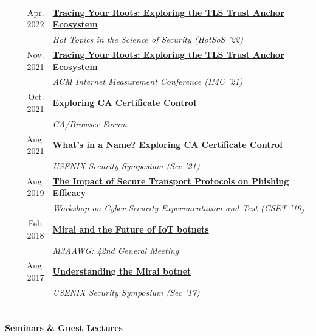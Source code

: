 \documentclass[10pt,singlecolumn]{article} %
\begin{document}
\begin{tabular}{rl}
Apr. 2022 & \textbf{\href{https://cps-vo.org/node/82522}{Tracing Your Roots: Exploring the TLS Trust Anchor Ecosystem}}\\
& \emph{Hot Topics in the Science of Security (HotSoS '22)}\\
Nov. 2021 & \textbf{\href{https://zanema.com/videos/imc21-roots.mp4}{Tracing Your Roots: Exploring the TLS Trust Anchor Ecosystem}}\\
& \emph{ACM Internet Measurement Conference (IMC '21)} \\
Oct. 2021 & \textbf{\href{https://zanema.com/slides/cab_forum_ca_transparency.pdf}{Exploring CA Certificate Control}}\\
& \emph{CA/Browser Forum} \\
Aug. 2021 & \textbf{\href{https://www.youtube.com/watch?v=Aq1o8prmoyE}{What's in a Name? Exploring CA Certificate Control}} \\
& \emph{USENIX Security Symposium (Sec '21)} \\
Aug. 2019 & \textbf{\href{https://zanema.com/slides/cset-https-phishing-2019.pdf}{The Impact of Secure Transport Protocols on Phishing Efficacy}} \\
& \emph{Workshop on Cyber Security Experimentation and Test (CSET '19)} \\
Feb. 2018 & \textbf{\href{https://zanema.com/slides/m3aawg_mirai.pdf}{Mirai and the Future of IoT botnets}}\\
& \emph{M3AAWG: 42nd General Meeting} \\ 
Aug. 2017 & \textbf{\href{https://www.youtube.com/watch?v=1pywzRTJDaY}{Understanding the Mirai botnet}} \\
& \emph{USENIX Security Symposium (Sec '17)} \\ 
\end{tabular} \\

\vspace{0.3cm}
\textbf{Seminars \& Guest Lectures}\\
\end{document}
